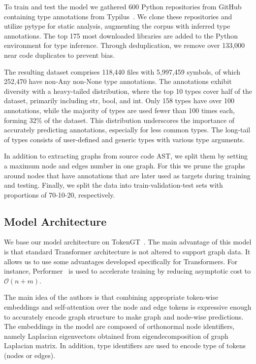 \documentclass[conference]{IEEEtran}
\begin{document}
To train and test the model we gathered 600 Python repositories from GitHub containing type annotations from Typilus~\cite{allamanis2020typilus}.
We clone these repositories and utilize pytype for static analysis, augmenting the corpus with inferred type annotations.
The top 175 most downloaded libraries are added to the Python environment for type inference.
Through deduplication, we remove over 133,000 near code duplicates to prevent bias.

The resulting dataset comprises 118,440 files with 5,997,459 symbols, of which 252,470 have non-Any non-None type annotations.
The annotations exhibit diversity with a heavy-tailed distribution, where the top 10 types cover half of the dataset, primarily including str, bool, and int.
Only 158 types have over 100 annotations, while the majority of types are used fewer than 100 times each, forming 32\% of the dataset.
This distribution underscores the importance of accurately predicting annotations, especially for less common types.
The long-tail of types consists of user-defined and generic types with various type arguments.

In addition to extracting graphs from source code AST, we split them by setting a maximum node and edges number in one graph.
For this we prune the graphs around nodes that have annotations that are later used as targets during training and testing.
Finally, we split the data into train-validation-test sets with proportions of 70-10-20, respectively.

\subsection{Model Architecture}\label{subsec:model-architecture}

We base our model architecture on TokenGT~\cite{kim_pure_2022}.
The main advantage of this model is that standard Transformer architecture is not altered to support graph data.
It allows us to use some advantages developed specifically for Transformers.
For instance, Performer~\cite{choromanski_rethinking_2020} is used to accelerate training by reducing asymptotic cost to
$\mathcal{O}(n+m)$.

The main idea of the authors is that combining appropriate token-wise embeddings and self-attention over the node and edge tokens
is expressive enough to accurately encode graph structure to make graph and node-wise predictions.
The embeddings in the model are composed of orthonormal node identifiers, namely Laplacian eigenvectors obtained from
eigendecomposition of graph Laplacian matrix.
In addition, type identifiers are used to encode type of tokens (nodes or edges).
\end{document}
